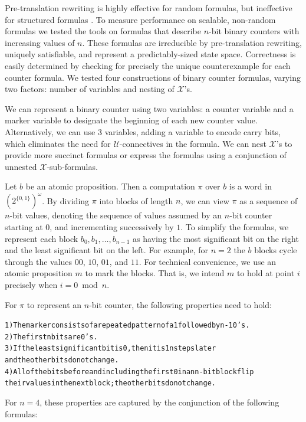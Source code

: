 \documentclass{article}
\begin{document}
Pre-translation rewriting is highly effective for random formulas, but ineffective for structured formulas \cite{EH00,SB00}. To measure performance on scalable, non-random formulas we tested the tools on formulas that describe $n$-bit binary counters with increasing values of $n$. These formulas are irreducible by pre-translation rewriting, uniquely satisfiable, and represent a predictably-sized state space. Correctness is easily determined by checking for precisely the unique counterexample for each counter formula. We tested four constructions of binary counter formulas, varying two factors: number of variables and nesting of $\mathcal{X}$'s.

We can represent a binary counter using two variables: a counter variable and a marker variable to designate the beginning of each new counter value. Alternatively, we can use 3 variables, adding a variable to encode carry bits, which eliminates the need for $\mathcal{U}$-connectives in the formula. We can nest $\mathcal{X}$'s to provide more succinct formulas or express the formulas using a conjunction of unnested $\mathcal{X}$-sub-formulas.

Let $b$ be an atomic proposition. Then a computation $\pi$ over $b$ is a word in $(2^{\{0,1\}})^\omega$. By dividing $\pi$ into blocks of length $n$, we can view $\pi$ as a sequence of $n$-bit values, denoting the sequence of values assumed by an $n$-bit counter starting at $0$, and incrementing successively by $1$. To simplify the formulas, we represent each block $b_0,b_1,\ldots,b_{n-1}$ as having the most significant bit on the right and the least significant bit on the left. For example, for $n=2$ the $b$ blocks cycle through the values $00$, $10$, $01$, and $11$. For technical convenience, we use an atomic proposition $m$ to mark the blocks. That is, we intend $m$ to hold at point $i$ precisely when $i=0 \bmod n$.

For $\pi$ to represent an $n$-bit counter, the following properties need to hold:

\begin{alltt}
1) The marker consists of a repeated pattern of a 1 followed by n-1 0's.
2) The first n bits are 0's.
3) If the least significant bit is 0, then it is 1 n steps later 
   and the other bits do not change.
4) All of the bits before and including the first 0 in an n-bit block flip
   their values in the next block; the other bits do not change.
\end{alltt} 

For $n=4$, these properties are captured by the conjunction of the following formulas:
\end{document}
